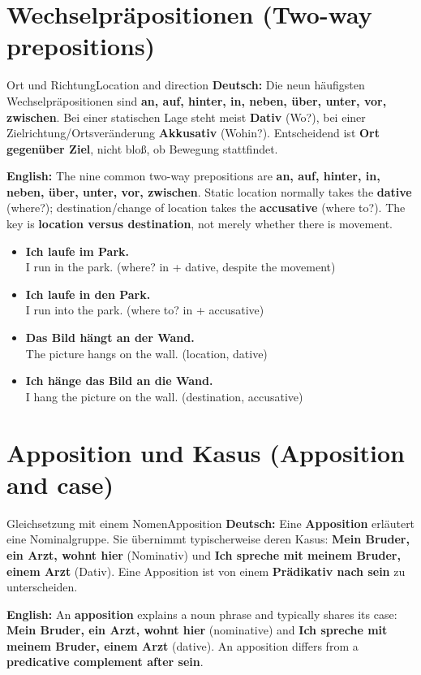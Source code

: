 \documentclass[a4paper,11pt]{article}
\newcommand{\GermanText}[1]{\textbf{Deutsch: }#1\par}
\newcommand{\EnglishText}[1]{{\small\color{SoftGray}\textbf{English: }#1\par}}
\newcommand{\ExampleItem}[2]{\item \textbf{#1}\\{\small\color{SoftGray}#2}}
\begin{document}
    \section{Wechselpräpositionen \textnormal{(Two-way prepositions)}}
        \begin{grammarentry}{Ort und Richtung}{Location and direction}
            \GermanText{Die neun häufigsten Wechselpräpositionen sind \textbf{an, auf, hinter, in, neben, über, unter, vor, zwischen}. Bei einer statischen Lage steht meist \textbf{Dativ} (Wo?), bei einer Zielrichtung/Ortsveränderung \textbf{Akkusativ} (Wohin?). Entscheidend ist \textbf{Ort gegenüber Ziel}, nicht bloß, ob Bewegung stattfindet.}
            \EnglishText{The nine common two-way prepositions are \textbf{an, auf, hinter, in, neben, über, unter, vor, zwischen}. Static location normally takes the \textbf{dative} (where?); destination/change of location takes the \textbf{accusative} (where to?). The key is \textbf{location versus destination}, not merely whether there is movement.}
        \end{grammarentry}
        \begin{exbox}\begin{itemize}
            \ExampleItem{Ich laufe im Park.}{I run in the park. (where? in + dative, despite the movement)}
            \ExampleItem{Ich laufe in den Park.}{I run into the park. (where to? in + accusative)}
            \ExampleItem{Das Bild hängt an der Wand.}{The picture hangs on the wall. (location, dative)}
            \ExampleItem{Ich hänge das Bild an die Wand.}{I hang the picture on the wall. (destination, accusative)}
        \end{itemize}\end{exbox}

    \section{Apposition und Kasus \textnormal{(Apposition and case)}}
        \begin{grammarentry}{Gleichsetzung mit einem Nomen}{Apposition}
            \GermanText{Eine \textbf{Apposition} erläutert eine Nominalgruppe. Sie übernimmt typischerweise deren Kasus: \textbf{Mein Bruder, ein Arzt, wohnt hier} (Nominativ) und \textbf{Ich spreche mit meinem Bruder, einem Arzt} (Dativ). Eine Apposition ist von einem \textbf{Prädikativ nach sein} zu unterscheiden.}
            \EnglishText{An \textbf{apposition} explains a noun phrase and typically shares its case: \textbf{Mein Bruder, ein Arzt, wohnt hier} (nominative) and \textbf{Ich spreche mit meinem Bruder, einem Arzt} (dative). An apposition differs from a \textbf{predicative complement after sein}.}
        \end{grammarentry}
\end{document}
